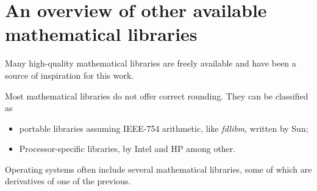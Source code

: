 \section{An overview of other  available mathematical libraries\label{section:lib-overview}}

Many high-quality mathematical libraries are freely available and have
been a source of inspiration for this work.

Most mathematical libraries do not offer correct rounding. They can be classified as 
\begin{itemize}
\item portable libraries  assuming IEEE-754
  arithmetic, like \emph{fdlibm}, written by Sun\cite{FDLIBMweb};
\item  Processor-specific libraries, by
  Intel\cite{HarKubStoTan99,IntelOpenSource} and
  HP\cite{Markstein2000,Markstein2001} among other.
\end{itemize}

Operating systems often include several mathematical libraries, some of which are derivatives of one
of the previous.

